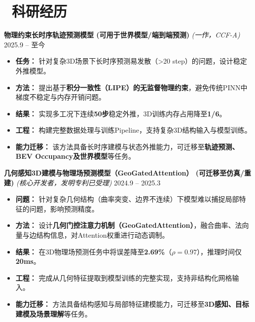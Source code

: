 \documentclass[11pt]{article}
\begin{document}

\section{\makebox[\widthof{\faUsers}][c]{\color{CVBlue}\faUsers}\ 
科研经历}


\textbf{物理约束长时序轨迹预测模型 (可用于世界模型/端到端预测)} 
\textit{(一作，CCF-A)} 
\hfill 2025.9 -- 至今
\begin{itemize}
    \item \textbf{任务：} 针对复杂3D场景下长时序预测易发散（>20 step）的问题，设计稳定外推模型。
    \item \textbf{方法：} 提出基于\textbf{积分一致性（LIPE）的无监督物理约束}，避免传统PINN中梯度不稳定与内存开销问题。
    \item \textbf{结果：} 实现多工况下连续\textbf{50步}稳定外推，3D训练内存占用降至\textbf{1/6}。
    \item \textbf{工程：} 构建完整数据处理与训练Pipeline，支持复杂3D结构输入与模型训练。
    \item \textbf{能力迁移：} 该方法具备长时序建模与状态外推能力，可迁移至\textbf{轨迹预测、BEV Occupancy及世界模型}等任务。
\end{itemize}

\textbf{几何感知3D建模与物理场预测模型（GeoGatedAttention） (可迁移至仿真/重建)} 
\textit{(核心开发者，发明专利已受理)} 
\hfill 2024.9 -- 2025.3
\begin{itemize}
    \item \textbf{问题：} 针对复杂几何结构（曲率突变、边界不连续）下模型难以捕捉局部特征的问题，影响预测精度。
    \item \textbf{方法：} 设计\textbf{几何门控注意力机制（GeoGatedAttention）}，融合曲率、法向量与边结构信息，对Attention权重进行动态调制。
    \item \textbf{结果：} 在3D物理场预测任务中将误差降至\textbf{2.69\%}（$\rho=0.97$），推理时间仅\textbf{20ms}。
    \item \textbf{工程：} 完成从几何特征提取到模型训练的完整实现，支持非结构化网格输入。
    \item \textbf{能力迁移：} 方法具备结构感知与局部特征建模能力，可迁移至\textbf{3D感知、目标建模及场景理解}等任务。
\end{itemize}
\end{document}
